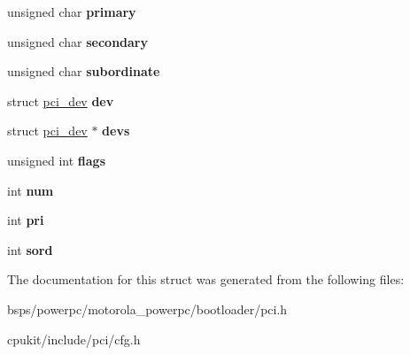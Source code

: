 \begin{DoxyCompactItemize}
unsigned char {\bfseries primary}
\item 
\mbox{\label{structpci__bus_ac233bf3f199bcacdb4b65b192e089000}} 
unsigned char {\bfseries secondary}
\item 
\mbox{\label{structpci__bus_a692605aea9a8ad092cb46e512254602b}} 
unsigned char {\bfseries subordinate}
\item 
\mbox{\label{structpci__bus_a8ea104dfe8dffb48c6f7b272acccd9be}} 
struct \mbox{\hyperlink{structpci__dev}{pci\+\_\+dev}} {\bfseries dev}
\item 
\mbox{\label{structpci__bus_a21f0003ba0334203ac6809379cc2d9d9}} 
struct \mbox{\hyperlink{structpci__dev}{pci\+\_\+dev}} $\ast$ {\bfseries devs}
\item 
\mbox{\label{structpci__bus_a868411aa60365f883832f4be1d29f637}} 
unsigned int {\bfseries flags}
\item 
\mbox{\label{structpci__bus_ab694c0425eb15149eff48bd38f0c0242}} 
int {\bfseries num}
\item 
\mbox{\label{structpci__bus_ac2aeb8be63173eb75d92f4b04ecebded}} 
int {\bfseries pri}
\item 
\mbox{\label{structpci__bus_aeb6276e0f376f49e3b294176867ad9e3}} 
int {\bfseries sord}
\end{DoxyCompactItemize}


The documentation for this struct was generated from the following files\+:\begin{DoxyCompactItemize}
\item 
bsps/powerpc/motorola\+\_\+powerpc/bootloader/pci.\+h\item 
cpukit/include/pci/cfg.\+h\end{DoxyCompactItemize}
